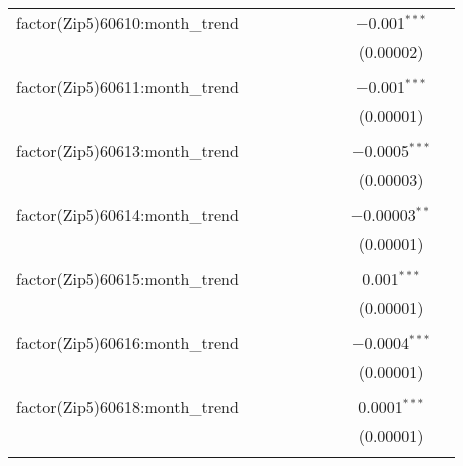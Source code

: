 \begin{table}[H]
{\begin{tabular}{@{\extracolsep{5pt}}lcccccccc}
  factor(Zip5)60610:month\_trend &  &  &  &  &  &  & $-$0.001$^{***}$ &  \\  

   &  &  &  &  &  &  & (0.00002) &  \\  

   & & & & & & & & \\  

  factor(Zip5)60611:month\_trend &  &  &  &  &  &  & $-$0.001$^{***}$ &  \\  

   &  &  &  &  &  &  & (0.00001) &  \\  

   & & & & & & & & \\  

  factor(Zip5)60613:month\_trend &  &  &  &  &  &  & $-$0.0005$^{***}$ &  \\  

   &  &  &  &  &  &  & (0.00003) &  \\  

   & & & & & & & & \\  

  factor(Zip5)60614:month\_trend &  &  &  &  &  &  & $-$0.00003$^{**}$ &  \\  

   &  &  &  &  &  &  & (0.00001) &  \\  

   & & & & & & & & \\  

  factor(Zip5)60615:month\_trend &  &  &  &  &  &  & 0.001$^{***}$ &  \\  

   &  &  &  &  &  &  & (0.00001) &  \\  

   & & & & & & & & \\  

  factor(Zip5)60616:month\_trend &  &  &  &  &  &  & $-$0.0004$^{***}$ &  \\  

   &  &  &  &  &  &  & (0.00001) &  \\  

   & & & & & & & & \\  

  factor(Zip5)60618:month\_trend &  &  &  &  &  &  & 0.0001$^{***}$ &  \\  

   &  &  &  &  &  &  & (0.00001) &  \\  

   & & & & & & & & \\  


\end{tabular}}
\end{table}
